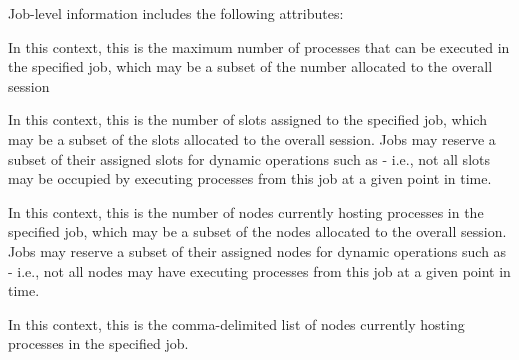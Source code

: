 Job-level information includes the following attributes:

%

%

%

%
In this context, this is the maximum number of processes that can be executed in the specified job, which may be a subset of the number allocated to the overall session
\pasteAttributeItemEnd{}

%
In this context, this is the number of
slots assigned to the specified job, which may be a subset of the slots
allocated to the overall session. Jobs may reserve a subset of their assigned
slots for dynamic operations such as  - i.e., not all slots
may be occupied by executing processes from this job at a given point in time.
\pasteAttributeItemEnd{}

%
In this context, this is the number of
nodes currently hosting processes in the specified job, which may be a subset
of the nodes allocated to the overall session. Jobs may reserve a subset of
their assigned nodes for dynamic operations such as  -
i.e., not all nodes may have executing processes from this job at a given
point in time.
\pasteAttributeItemEnd{}

In this context, this is the comma-delimited list of nodes currently hosting processes in the specified job.
\pasteAttributeItemEnd{}

%


%

%

